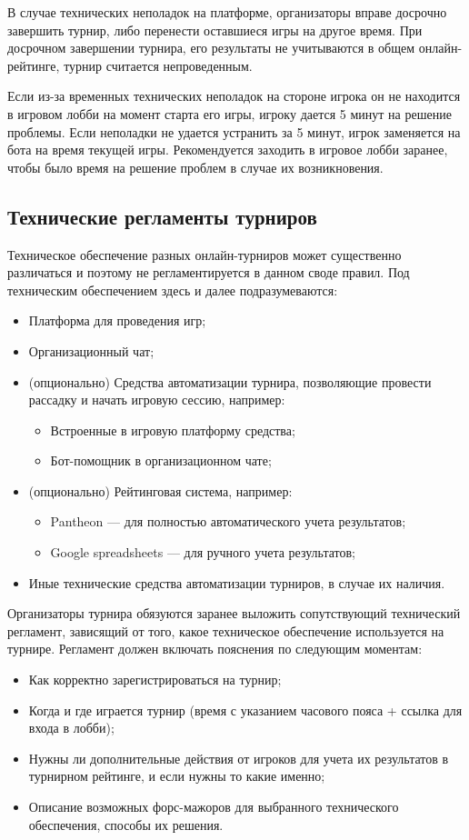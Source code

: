 В случае технических неполадок на платформе, организаторы вправе досрочно завершить турнир, либо перенести оставшиеся игры на другое время. При досрочном завершении турнира, его результаты не учитываются в общем онлайн-рейтинге, турнир считается непроведенным.

Если из-за временных технических неполадок на стороне игрока он не находится в игровом лобби на момент старта его игры, игроку дается 5 минут на решение проблемы. Если неполадки не удается устранить за 5 минут, игрок заменяется на бота на время текущей игры. Рекомендуется заходить в игровое лобби заранее, чтобы было время на решение проблем в случае их возникновения.

\subsection{Технические регламенты турниров}

Техническое обеспечение разных онлайн-турниров может существенно различаться и поэтому не регламентируется в данном своде правил. Под техническим обеспечением здесь и далее подразумеваются:

\begin{itemize}
	\item Платформа для проведения игр;
	\item Организационный чат;
	\item (опционально) Средства автоматизации турнира, позволяющие провести рассадку и начать игровую сессию, например:
	\begin{itemize}
		\item Встроенные в игровую платформу средства;
		\item Бот-помощник в организационном чате;
	\end{itemize}
	\item (опционально) Рейтинговая система, например:
	\begin{itemize}
		\item Pantheon --- для полностью автоматического учета результатов;
		\item Google spreadsheets --- для ручного учета результатов;
	\end{itemize}
	\item Иные технические средства автоматизации турниров, в случае их наличия.
\end{itemize}


Организаторы турнира обязуются заранее выложить сопутствующий технический регламент, зависящий от того, какое техническое обеспечение используется на турнире. Регламент должен включать пояснения по следующим моментам:
\begin{itemize}
	\item Как корректно зарегистрироваться на турнир;
	\item Когда и где играется турнир (время с указанием часового пояса + ссылка для входа в лобби);
	\item Нужны ли дополнительные действия от игроков для учета их результатов в турнирном рейтинге, и если нужны то какие именно;
	\item Описание возможных форс-мажоров для выбранного технического обеспечения, способы их решения.
\end{itemize}

